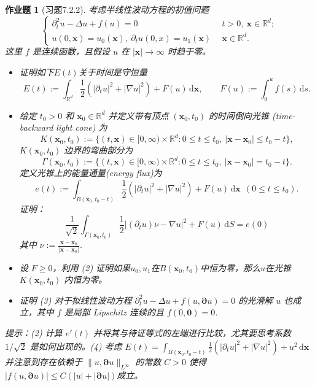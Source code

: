 \documentclass[UTF8,fontset=windows,12pt]{ctexart}
\theoremstyle{kaiti-theorem}
\newtheorem{problem}{作业题}
\numberwithin{equation}{section}
\newcommand{\R}{\mathbb{R}}
\newcommand{\bds}[1]{\boldsymbol{#1}}  %
\newcommand{\q}{\quad}
\newcommand{\p}{\partial}
\newcommand{\pb}{\boldsymbol{\partial}}
\newcommand{\lap}{\Delta}
\newcommand{\nab}{\nabla}
\newcommand{\dxx}{\,\mathrm{d}\bds{x}}
\newcommand{\dS}{\,\mathrm{d}S}
\newcommand{\ds}{\,\mathrm{d}s}
\newcommand{\xx}{{\bds{x}}}
\begin{document}
\begin{problem}[习题7.2.2] 
考虑半线性波动方程的初值问题
\begin{equation}
\begin{cases}
\p_t^2 u -\lap  u +f( u )=0&~~t>0,~\xx\in\R^d;\\
 u (0,\xx)= u_0(\xx),~\p_t  u (0,x)=u_1(\xx)&~~\xx\in\R^d.
\end{cases}
\end{equation} 这里 $f$ 是连续函数，且假设 $ u $ 在 $|\xx|\to\infty$ 时趋于零。
\begin{itemize}
\item [(1)] 证明如下$E(t)$关于时间是守恒量
\[
E(t):=\int_{\R^d}\frac12(|\p_t  u |^2+|\nab  u |^2) + F( u )\dxx,\q\q F(u):=\int_0^u f(s)\ds.
\] 
\item [(2)] 给定 $t_0>0$ 和 $\xx_0\in\R^d$ 并定义带有顶点 $(\xx_0,t_0)$ 的时间倒向光锥 (time-backward light cone) 为
\[
K(\xx_0,t_0):=\{(t,\xx)\in[0,\infty)\times \R^d : 0\leqslant t\leqslant t_0,~|\xx-\xx_0|\leqslant t_0-t\},
\]  $K(\xx_0,t_0)$ 边界的弯曲部分为
\[
\Gamma(\xx_0,t_0):=\{(t,\xx)\in  [0,\infty)\times\R^d: 0\leqslant t\leqslant t_0,~|\xx-\xx_0|= t_0-t\}.
\] 定义光锥上的能量通量(energy flux)为
\[
e(t):=\int_{B(\xx_0,t_0-t)}\frac12(|\p_t  u |^2+|\nab  u |^2) +F( u )\dxx~~(0\leqslant t\leqslant t_0).
\] 证明：
\begin{equation}
\frac{1}{\sqrt{2}}\int_{\Gamma(\xx_0,t_0)}\frac12|(\p_t  u )\nu-\nab  u |^2+F( u )\dS=e(0)
\end{equation}其中 $\nu:=\frac{\xx-\xx_0}{|\xx-\xx_0|}$.
\item [(3)] 设 $F\geqslant 0$，利用 (2) 证明如果$ u_0,  u_1$在$B(\xx_0,t_0)$中恒为零，那么$ u $在光锥$K(\xx_0,t_0)$ 内恒为零。
\item [(4)] 证明 (3) 对于拟线性波动方程 $\p_t^2  u  -\lap  u  + f( u ,\pb  u )=0$ 的光滑解 $ u $ 也成立，其中 $f$ 是局部 Lipschitz 连续的且 $f(0,\mathbf{0})=0$. 
\end{itemize}

提示：(2) 计算 $e'(t)$ 并将其与待证等式的左端进行比较，尤其要思考系数 $1/\sqrt{2}$ 是如何出现的。(4) 考虑 $E(t)=\int_{B(\xx_0,t_0-t)}\frac12(|\p_t  u |^2+|\nab  u |^2) +  u^2\dxx$ 并注意到存在依赖于 $\| u ,\pb  u \|_{L^\infty}$ 的常数 $C>0$ 使得 $|f( u ,\pb u )|\leqslant C(| u |+|\pb u |)$成立。
\end{problem}
\end{document}
